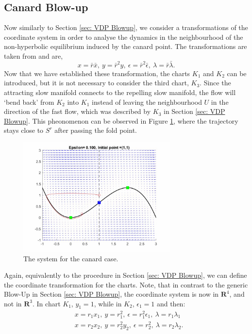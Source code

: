 \subsection{Canard Blow-up}
Now similarly to Section \ref{sec: VDP Blowup}, we consider a transformations of the coordinate system in order to analyse the dynamics in the neighbourhood of the non-hyperbolic equilibrium induced by the canard point. %
 The transformations are taken from \citep{krupa2001} and are,
\begin{equation}
x=\bar{r}\bar{x}, \ y=\bar{r}^2y, \ \epsilon=\bar{r}^2\bar{\epsilon}, \ \lambda=\bar{r}\bar{\lambda}.
\end{equation}
Now that we have established these transformation, the charts $K_1$ and $K_2$ can be introduced,  but it is not necessary to consider the third chart, $K_3$. Since the attracting slow manifold connects to the repelling slow manifold, the flow will `bend back' from $K_2$ into $K_1$ instead of leaving the neighbourhood $U$ in the direction of the fast flow, which was described by $K_3$ in Section \ref{sec: VDP Blowup}. 
This pheonomenon can be observed in Figure \ref{fig: flow in canard}, where the trajectory stays close to $S^r$ after passing the fold point.
\begin{figure}[h!]
	\centering
\includegraphics[width=8cm, height=6cm]{Images/vdPhopf-Moment-bendback}
	\caption{The \vdp system for the canard case.}
	\label{fig: flow in canard}
\end{figure}\newpage
Again, equivalently to the procedure in Section \ref{sec: VDP Blowup}, we can define the coordinate transformation for the charts. Note, that in contrast to the generic Blow-Up in Section \ref{sec: VDP Blowup}, the coordinate system is now in $\mathbf{R}^4$, and not in $\mathbf{R}^3$. In chart $K_1$, $y_1=1$, while in $K_2$, $\epsilon_1=1$ and then:
\begin{subequations}
	\begin{align}
	&x=r_1x_1, \ y=r_1^2, \ \epsilon=r_1^2\epsilon_1, \ \lambda=r_1\lambda_1 \label{eq: coordiante K1}\\ 
	&x=r_2x_2, \ y=r_2^2y_2, \ \epsilon=r^2_2, \ \lambda=r_2\lambda_2 \label{eq: coordinate K2}.
	\end{align}
\end{subequations}
